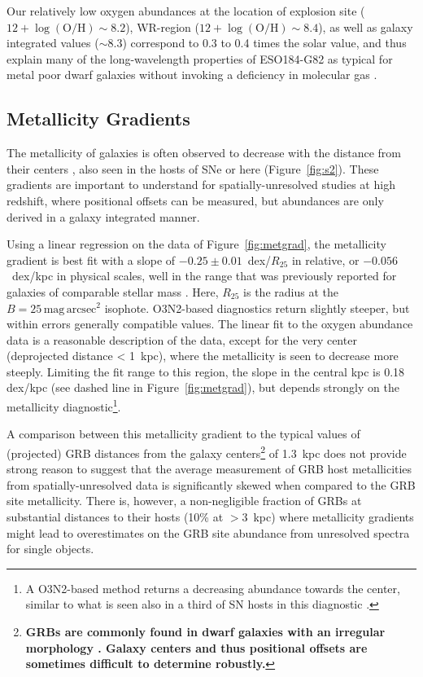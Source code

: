 \documentclass[traditabstract]{aa}
\newcommand{\oh}{12+\log(\mathrm{O/H})}
\begin{document}
Our relatively low oxygen abundances at the location of explosion site ($\oh\sim8.2$), WR-region ($\oh\sim8.4$), as well as galaxy integrated values ($\sim8.3$) correspond to 0.3 to 0.4 times the solar value, and thus explain many of the long-wavelength properties of ESO184-G82 as typical for metal poor dwarf galaxies without invoking a deficiency in molecular gas \citep{2016arXiv160901742M}.


\subsection{Metallicity Gradients}
\label{sec:metgrad}

The metallicity of galaxies is often observed to decrease with the distance from their centers \citep[e.g.][]{1994ApJ...420...87Z, 2014A&A...563A..49S}, also seen in the hosts of SNe \citep{2016A&A...591A..48G} or here (Figure~\ref{fig:s2}). These gradients are important to understand for spatially-unresolved studies at high redshift, where positional offsets can be measured, but abundances are only derived in a galaxy integrated manner. 

Using a linear regression on the data of Figure~\ref{fig:metgrad}, the metallicity gradient is best fit with a slope of $-0.25\pm0.01$~dex/$R_{25}$ in relative, or $-0.056$~dex/kpc in physical scales, well in the range that was previously reported for galaxies of comparable stellar mass \citep{2015MNRAS.448.2030H}. Here, $R_{25}$ is the radius at the $B=25\,\mathrm{mag}\,\mathrm{arcsec}^2$ isophote. O3N2-based diagnostics return slightly steeper, but within errors generally compatible values. The linear fit to the oxygen abundance data is a reasonable description of the data, except for the very center (deprojected distance < 1~kpc), where the metallicity is seen to decrease more steeply. Limiting the fit range to this region, the slope in the central kpc is 0.18 dex/kpc (see dashed line in Figure~\ref{fig:metgrad}), but depends strongly on the metallicity diagnostic\footnote{A O3N2-based method returns a decreasing abundance towards the center, similar to what is seen also in a third of SN hosts in this diagnostic \citep{2016A&A...591A..48G}.}.

A comparison between this metallicity gradient to the typical values of (projected) GRB distances from the galaxy centers\footnote{\textbf{GRBs are commonly found in dwarf galaxies with an irregular morphology \citep[e.g.,][]{2006Natur.441..463F, 2017MNRAS.tmp..220L}. Galaxy centers and thus positional offsets are sometimes difficult to determine robustly.}} of 1.3~kpc \citep{2016ApJ...817..144B} does not provide strong reason to suggest that the average measurement of GRB host metallicities from spatially-unresolved data is significantly skewed when compared to the GRB site metallicity. There is, however, a non-negligible fraction of GRBs at substantial distances to their hosts (10\% at $>3$~kpc) where metallicity gradients might lead to overestimates on the GRB site abundance from unresolved spectra for single objects.
\end{document}
